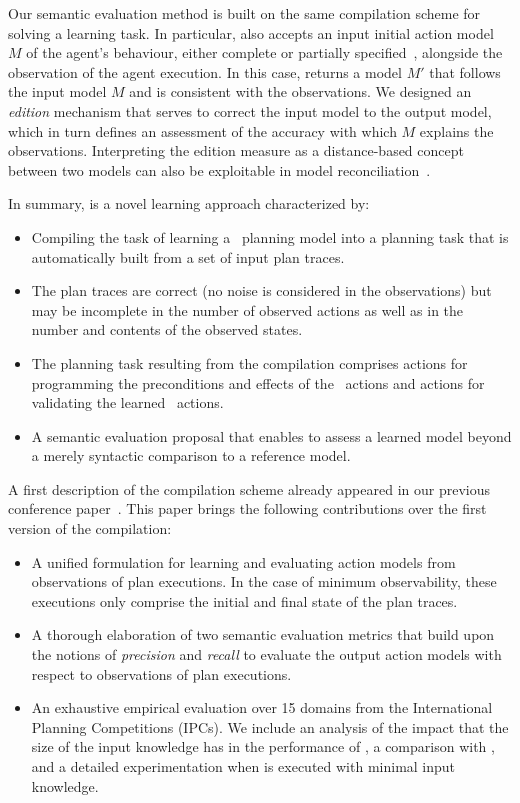 Our semantic evaluation method is built on the same compilation scheme for solving a learning task. In particular, \FAMA also accepts an input initial action model $M$ of the agent's behaviour, either complete or partially specified~\cite{ZhuoNK13,ZhuoK17}, alongside the observation of the agent execution. In this case, \FAMA returns a model $M'$ that follows the input model $M$ and is consistent with the observations. We designed an {\em edition} mechanism that serves to correct the input model to the output model, which in turn defines an assessment of the accuracy with which $M$ explains the observations. Interpreting the edition measure as a distance-based concept between two models can also be exploitable in model reconciliation~\cite{KulkarniCZVZK16}.


In summary, \FAMA is a novel learning approach characterized by:
\begin{itemize}
\item Compiling the task of learning a \strips\ planning model into a planning task that is automatically built from a set of input plan traces.
\item The plan traces are correct (no noise is considered in the observations) but may be incomplete in the number of observed actions as well as in the number and contents of the observed states.
\item The planning task resulting from the compilation comprises actions for programming the preconditions and effects of the \strips\ actions and actions for validating the learned \strips\ actions.
\item A semantic evaluation proposal that enables to assess a learned model beyond a merely syntactic comparison to a reference model.
\end{itemize} 

A first description of the \FAMA compilation scheme already appeared in our previous conference paper~\cite{aineto2018learning}. This paper brings the following contributions over the first version of the compilation:

\begin{itemize}
\item A unified formulation for learning and evaluating action models from observations of plan executions. In the case of minimum observability, these executions only comprise the initial and final state of the plan traces.
\item A thorough elaboration of two semantic evaluation metrics that build upon the notions of {\em precision} and {\em recall} to evaluate the output action models with respect to observations of plan executions.
\item An exhaustive empirical evaluation over 15 domains from the International Planning Competitions (IPCs). We include an analysis of the impact that the size of the input knowledge has in the performance of \FAMA, a comparison with \ARMS, and a detailed experimentation when \FAMA is executed with minimal input knowledge.
\end{itemize}


